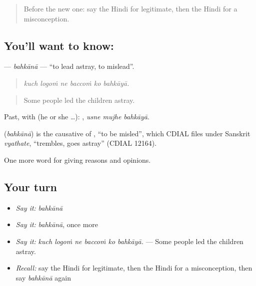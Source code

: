 \label{lesson:HI-C366-bahkana}



\begin{quote}
Before the new one: say the Hindi for legitimate, then the Hindi for a misconception.
\end{quote}

\subsection*{You'll want to know: }
\textbf{} — \emph{bahkānā} — \textquotedblleft{}to lead astray, to mislead\textquotedblright{}.

\begin{quote}
     
\end{quote}

\begin{quote}
\emph{kuch logoṁ ne baccoṁ ko bahkāyā.}
\end{quote}

\begin{quote}
Some people led the children astray.
\end{quote}

Past, with  (he or she …):   , \emph{usne mujhe bahkāyā}.

\begin{cousinweb}
\textbf{} (\emph{bahkānā}) is the causative of , \textquotedblleft{}to be misled\textquotedblright{}, which CDIAL files under Sanskrit \emph{vyathate}, \textquotedblleft{}trembles, goes astray\textquotedblright{} (CDIAL 12164).
\end{cousinweb}

\begin{grammarlens}[title={What you've built}]
One more word for giving reasons and opinions.
\end{grammarlens}

\subsection*{Your turn}
\begin{itemize}
\raggedright
  \item \emph{Say it:} \emph{bahkānā}
  \item \emph{Say it:} \emph{bahkānā}, once more
  \item \emph{Say it:} \emph{kuch logoṁ ne baccoṁ ko bahkāyā.} — Some people led the children astray.
  \item \emph{Recall:} say the Hindi for legitimate, then the Hindi for a misconception, then say \emph{bahkānā} again
\end{itemize}

